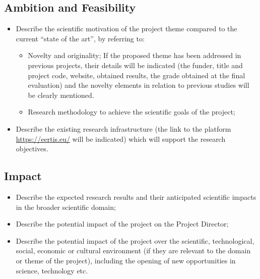 \documentclass[draftproposal,pncdib]{pncdi-pd}
\begin{document}
\subsection{Ambition and Feasibility}
\label{sc:project:feasibility}

\begin{pncdiexplanation}
\begin{itemize}
\item
Describe the scientific motivation of the project theme compared to the current
\enquote{state of the art}, by referring to:
\begin{itemize}
\item
Novelty and originality; If the proposed theme has been addressed in previous
projects, their details will be indicated (the funder, title and project code, website,
obtained results, the grade obtained at the final evaluation) and the novelty elements in
relation to previous studies will be clearly mentioned.

\item
Research methodology to achieve the scientific goals of the project;
\end{itemize}

\item
Describe the existing research infrastructure (the link to the platform \url{https://eertis.eu/}
will be indicated) which will support the research objectives.
\end{itemize}
\end{pncdiexplanation}

\subsection{Impact}
\label{sc:project:impact}

\begin{pncdiexplanation}
\begin{itemize}
\item
Describe the expected research results and their anticipated scientific impacts in the
broader scientific domain;

\item
Describe the potential impact of the project on the Project Director;

\item
Describe the potential impact of the project over the scientific, technological,
social, economic or cultural environment (if they are relevant to the domain or theme
of the project), including the opening of new opportunities in science, technology etc.
\end{itemize}
\end{pncdiexplanation}
\end{document}
